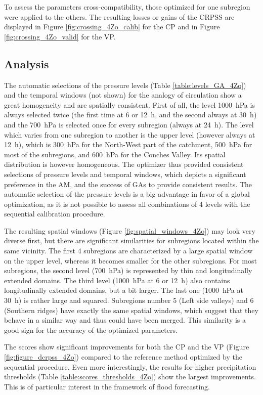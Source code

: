 \documentclass[review]{elsarticle}
\begin{document}
To assess the parameters cross-compatibility, those optimized for one subregion were applied to the others. The resulting losses or gains of the CRPSS are displayed in Figure \ref{fig:crossing_4Zo_calib} for the CP and in Figure \ref{fig:crossing_4Zo_valid} for the VP.


\subsection{Analysis}

The automatic selections of the pressure levels (Table \ref{table:levels_GA_4Zo}) and the temporal windows (not shown) for the analogy of circulation show a great homogeneity and are spatially consistent. First of all, the level 1000~hPa is always selected twice (the first time at 6 or 12~h, and the second always at 30~h) and the 700~hPa is selected once for every subregion (always at 24~h). The level which varies from one subregion to another is the upper level (however always at 12~h), which is 300~hPa for the North-West part of the catchment, 500~hPa for most of the subregions, and 600~hPa for the Conches Valley. Its spatial distribution is however homogeneous. The optimizer thus provided consistent selections of pressure levels and temporal windows, which depicts a significant preference in the AM, and the success of GAs to provide consistent results. The automatic selection of the pressure levels is a big advantage in favor of a global optimization, as it is not possible to assess all combinations of 4 levels with the sequential calibration procedure.

The resulting spatial windows (Figure \ref{fig:spatial_windows_4Zo}) may look very diverse first, but there are significant similarities for subregions located within the same vicinity. The first 4 subregions are characterized by a large spatial window on the upper level, whereas it becomes smaller for the other subregions. For most subregions, the second level (700~hPa) is represented by thin and longitudinally extended domains. The third level (1000~hPa at 6 or 12~h) also contains longitudinally extended domains, but a bit larger. The last one (1000~hPa at 30~h) is rather large and squared. Subregions number 5 (Left side valleys) and 6 (Southern ridges) have exactly the same spatial windows, which suggest that they behave in a similar way and thus could have been merged. This similarity is a good sign for the accuracy of the optimized parameters.

The scores show significant improvements for both the CP and the VP (Figure \ref{fig:figure_dcrpss_4Zo}) compared to the reference method optimized by the sequential procedure. Even more interestingly, the results for higher precipitation thresholds (Table \ref{table:scores_thresholds_4Zo}) show the largest improvements. This is of particular interest in the framework of flood forecasting.
\end{document}
